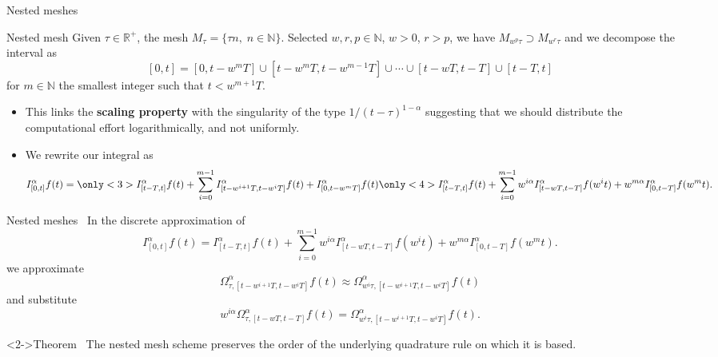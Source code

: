 \documentclass[aspectratio=169,xcolor=dvipsnames]{beamer}
\begin{document}
\begin{frame}{Nested meshes~\parencite{FordSpeedAccuracy}}
\begin{block}{Nested mesh}
Given $\tau \in \mathbb{R}^+$, the mesh $M_\tau = \{ \tau n, \; n \in \mathbb{N} \}$. Selected $w,r,p \in \mathbb{N}$, $w > 0$, $r > p$, we have $M_{w^p \tau} \supset M_{w^r \tau}$ and we decompose the interval as
\[
[0,t] = [0,t-w^m T] \cup [t - w^mT,t-w^{m-1}T] \cup \cdots \cup [t-wT,t-T]\cup[t-T,t]
\]
for $m \in \mathbb{N}$ the smallest integer such that $t < w^{m+1} T$.
\end{block}

\begin{itemize}
	\item[\faLightbulb]<2-> This links the \textbf{scaling property} with the singularity of the type $1/(t-\tau)^{1-\alpha}$ suggesting that we should distribute the computational effort logarithmically, and not uniformly.
	\item<3-> We rewrite our integral as
	\[
	I_{[0,t]}^\alpha f(t) = \only<3>{I_{[t-T,t]}^\alpha f(t) + \sum_{i=0}^{m-1} I_{[t-w^{i+1}T,t-w^iT]}^\alpha f(t) + I_{[0,t-w^mT]}^\alpha f(t)}
	\only<4>{I_{[t-T,t]}^\alpha f(t) + \sum_{i=0}^{m-1} w^{i\alpha} I_{[t-w T,t-T]}^\alpha f(w^i t) + w^{m\alpha}I_{[0,t-T]}^\alpha f(w^m t).}
	\]
\end{itemize}

\end{frame}

\begin{frame}{Nested meshes~\parencite{FordSpeedAccuracy}}
In the discrete approximation of
\[
I_{[0,t]}^\alpha f(t) = I_{[t-T,t]}^\alpha f(t) + \sum_{i=0}^{m-1} w^{i\alpha} I_{[t-w T,t-T]}^\alpha f(w^i t) + w^{m\alpha}I_{[0,t-T]}^\alpha f(w^m t).
\]
we approximate\vspace{-0.5em}
\[
\Omega_{\tau,[t-w^{i+1} T,t-w^i T]}^\alpha f(t) \approx \Omega_{w^i \tau,[t-w^{i+1} T,t-w^i T]}^\alpha f(t)
\]
and substitute\vspace{-0.5em}
\[
w^{i\alpha} \Omega_{\tau,[t-w T,t- T]}^\alpha f(t) = \Omega_{w^i \tau,[t-w^{i+1} T,t- w^{i} T]}^\alpha f(t).
\]
\begin{alertblock}<2->{Theorem~\parencite[Theorem~1]{FordSpeedAccuracy}}
The nested mesh scheme preserves the order of the underlying quadrature
rule on which it is based.
\end{alertblock}

\end{frame}
\end{document}
